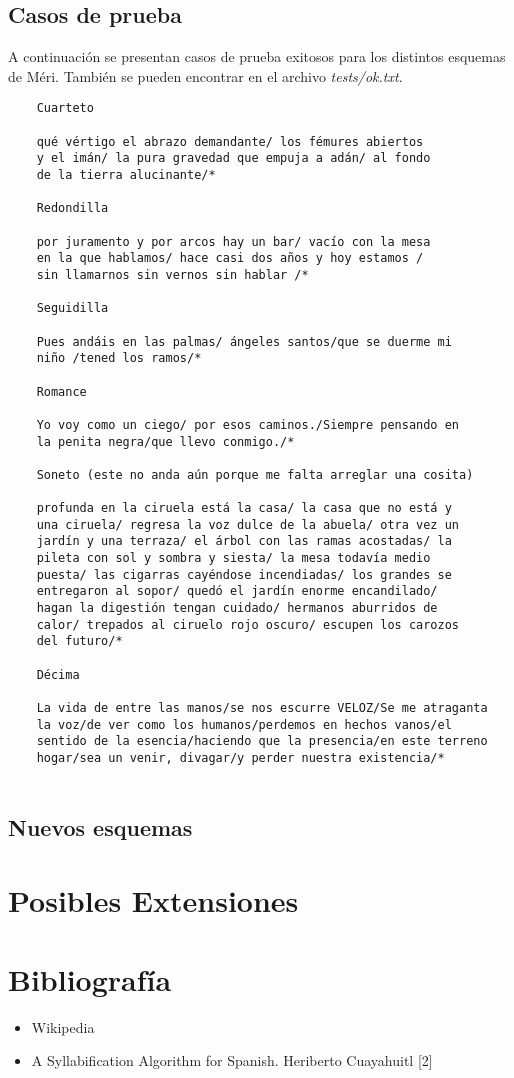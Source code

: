 \documentclass[12pt, a4paper]{article}
\begin{document}
\subsection*{Casos de prueba}
A continuación se presentan casos de prueba exitosos para los distintos esquemas de Méri. También se pueden encontrar en el archivo \textit{tests/ok.txt}.
\begin{verbatim}
    Cuarteto
    
    qué vértigo el abrazo demandante/ los fémures abiertos 
    y el imán/ la pura gravedad que empuja a adán/ al fondo
    de la tierra alucinante/*

    Redondilla

    por juramento y por arcos hay un bar/ vacío con la mesa 
    en la que hablamos/ hace casi dos años y hoy estamos / 
    sin llamarnos sin vernos sin hablar /*    

    Seguidilla
    
    Pues andáis en las palmas/ ángeles santos/que se duerme mi
    niño /tened los ramos/*
    
    Romance
    
    Yo voy como un ciego/ por esos caminos./Siempre pensando en 
    la penita negra/que llevo conmigo./*

    Soneto (este no anda aún porque me falta arreglar una cosita)
    
    profunda en la ciruela está la casa/ la casa que no está y 
    una ciruela/ regresa la voz dulce de la abuela/ otra vez un 
    jardín y una terraza/ el árbol con las ramas acostadas/ la 
    pileta con sol y sombra y siesta/ la mesa todavía medio 
    puesta/ las cigarras cayéndose incendiadas/ los grandes se 
    entregaron al sopor/ quedó el jardín enorme encandilado/ 
    hagan la digestión tengan cuidado/ hermanos aburridos de 
    calor/ trepados al ciruelo rojo oscuro/ escupen los carozos 
    del futuro/*

    Décima
    
    La vida de entre las manos/se nos escurre VELOZ/Se me atraganta
    la voz/de ver como los humanos/perdemos en hechos vanos/el 
    sentido de la esencia/haciendo que la presencia/en este terreno
    hogar/sea un venir, divagar/y perder nuestra existencia/*
           
\end{verbatim}

\subsection*{Nuevos esquemas}

\section*{Posibles Extensiones} 

\section*{Bibliografía}
 \begin{itemize}
 	\item Wikipedia
 	\item A Syllabification Algorithm for Spanish. Heriberto Cuayahuitl [2]
 \end{itemize}
\end{document}
